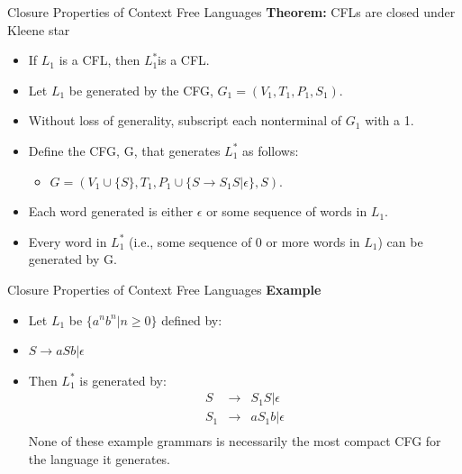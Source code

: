 \documentclass{beamer}
\begin{document}
\begin{frame}{Closure Properties of Context Free Languages}
	\textbf{Theorem:} CFLs are closed under Kleene star
	\begin{itemize}
		\item If $L_1$ is a CFL, then $L_1^* $is a CFL.
	\end{itemize}
\proofname 
\begin{itemize}
	\item Let $L_1$ be generated by the CFG, $G_1 = (V_1, T_1, P_1, S_1)$.
		\item Without loss of generality, subscript each nonterminal of $G_1$ with a 1.
		\item Define the CFG, G, that generates $L_1^*$	as follows:
		\begin{itemize}
			\item 	$G = (V_1 \cup \{S\}, T_1, P_1 \cup \{S \rightarrow S_1S | \epsilon \}, S).$
		\end{itemize}
		\item Each word generated is either $\epsilon$  or some sequence of words in $L_1$.
		\item Every word in $L_1^*$
	(i.e., some sequence of 0 or more words in $L_1$) can be generated by G.
\end{itemize}
\end{frame}
\begin{frame}{Closure Properties of Context Free Languages}
	\textbf{Example}
	\begin{itemize}
		 \item Let $L_1$ be $\{a^nb^n|n \geq 0\}$ defined by:
		\item $S \rightarrow aSb | \epsilon$
		\item Then $L_1^*$	is generated by:
	\begin{eqnarray*}
		S&\rightarrow& S_1S | \epsilon\\
		S_1&\rightarrow& aS_1b | \epsilon\\
	\end{eqnarray*}
		None of these example grammars is necessarily the most compact CFG
		for the language it generates.
	\end{itemize}
\end{frame}
\end{document}
